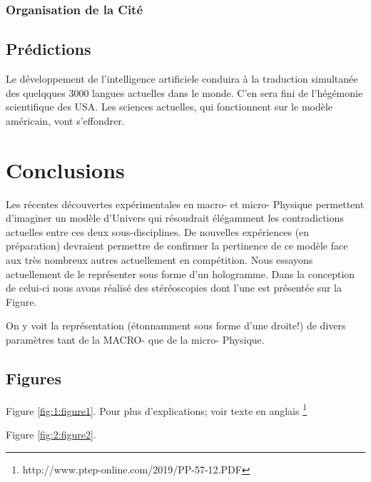 \documentclass[a4paper,12pt]{article}
\begin{document}
\subsubsection {Organisation de la Cité}


\subsection {Prédictions}
Le développement de l'intelligence artificiele conduira à la traduction simultanée des quelqques 3000 langues actuelles dans le monde. C'en sera fini de l'hégémonie scientifique des USA.
Les sciences actuelles, qui fonctionnent sur le modèle américain, vont s'effondrer. 









\section{Conclusions}
\label{sec:headings}

Les récentes découvertes expérimentales en macro- et micro- Physique permettent d'imaginer un modèle d'Univers qui résoudrait élégamment les contradictions actuelles entre ces deux sous-disciplines. De nouvelles expériences (en préparation) devraient permettre de confirmer la pertinence de ce modèle face aux très nombreux autres actuellement en compétition. Nous essayons actuellement de le représenter sous forme d'un hologramme. Dans la conception de celui-ci nous avons réalisé des stéréoscopies dont l'une est présentée sur la Figure.

On y voit la représentation (étonnamment sous forme d'une droite!) de divers paramètres tant de la MACRO- que de la micro- Physique.


\subsection{Figures}

Figure \ref{fig:1:figure1}. Pour plus d'explications; voir texte en anglais \footnote{http://www.ptep-online.com/2019/PP-57-12.PDF}

Figure \ref{fig:2:figure2}.
\end{document}
